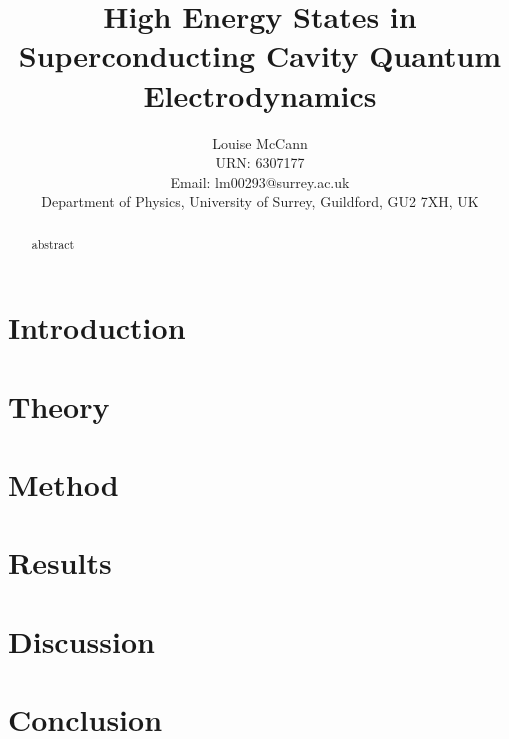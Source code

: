 \documentclass[11pt]{article}
\title{High Energy States in Superconducting Cavity Quantum Electrodynamics}
\author{Louise McCann \\ URN: 6307177 \\ Email: lm00293@surrey.ac.uk \\ Department of Physics, University of Surrey, Guildford, GU2 7XH, UK}
\begin{document}
    \maketitle

    \begin{abstract}
    abstract
    \end{abstract}

    \tableofcontents

    \section{Introduction}

    \section{Theory}

    \section{Method}

    \section{Results}

    \section{Discussion}

    \section{Conclusion}
\end{document}

